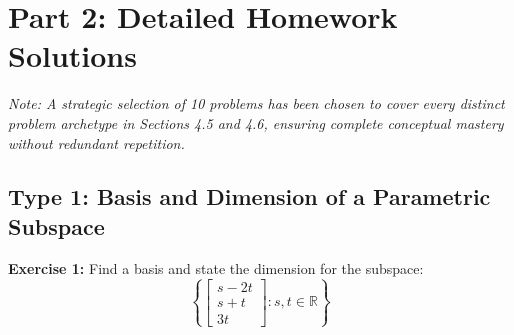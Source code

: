 \documentclass[12pt]{article}
\begin{document}
\newpage
\section{Part 2: Detailed Homework Solutions}
\textit{Note: A strategic selection of 10 problems has been chosen to cover every distinct problem archetype in Sections 4.5 and 4.6, ensuring complete conceptual mastery without redundant repetition.}

\subsection{Type 1: Basis and Dimension of a Parametric Subspace}

\textbf{Exercise 1:} Find a basis and state the dimension for the subspace:
\[ \left\{ \begin{bmatrix} s - 2t \\ s + t \\ 3t \end{bmatrix} : s, t \in \mathbb{R} \right\} \]
\end{document}
